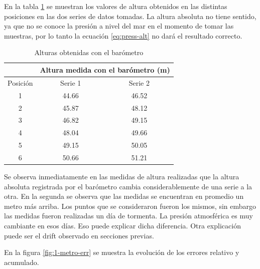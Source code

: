 \documentclass[spanish,12pt,a4paper,titlepage]{report}
\begin{document}

En la tabla \ref{tab:alturasm} se muestran los valores de altura obtenidos en las distintas posiciones en las dos series de datos tomadas. La altura absoluta no tiene sentido, ya que no se conoce la presión a nivel del mar en el momento de tomar las muestras, por lo tanto la ecuación \ref{eq:press-alt} no dará el resultado correcto.

\begin{table}[H]
\centering
\begin{tabular}{c|c|c|} 
	& \multicolumn{2}{|p{200pt}|}{\cellcolor[gray]{0.8} Altura medida con el barómetro (m)}      \\ \hline
\cellcolor[gray]{0.8} {Posición} & \cellcolor[gray]{0.8} {Serie 1} &\cellcolor[gray]{0.8} {Serie 2}\\ \hline

\multicolumn{1}{|c|}{1} & 44.66 & 46.52 \\ \hline
\multicolumn{1}{|c|}{2} & 45.87 & 48.12\\ \hline
\multicolumn{1}{|c|}{3} & 46.82 & 49.15\\ \hline
\multicolumn{1}{|c|}{4} & 48.04 & 49.66\\ \hline
\multicolumn{1}{|c|}{5} & 49.15 & 50.05\\ \hline
\multicolumn{1}{|c|}{6} & 50.66 & 51.21 \\ \hline

\end{tabular}
\caption{Alturas obtenidas con el barómetro}
\label{tab:alturasm}
\end{table}

Se observa inmediatamente en las medidas de altura realizadas que la altura absoluta registrada por el barómetro cambia considerablemente de una serie a la otra. En la segunda se observa que las medidas se encuentran en promedio un metro más arriba. Los puntos que se consideraron fueron los mismos, sin embargo las medidas fueron realizadas un día de tormenta. La presión atmosférica es muy cambiante en esos días. Eso puede explicar dicha diferencia. Otra explicación puede ser el drift observado en secciones previas.

En la figura \ref{fig:1-metro-err} se muestra la evolución de los errores relativo y acumulado.
\end{document}
